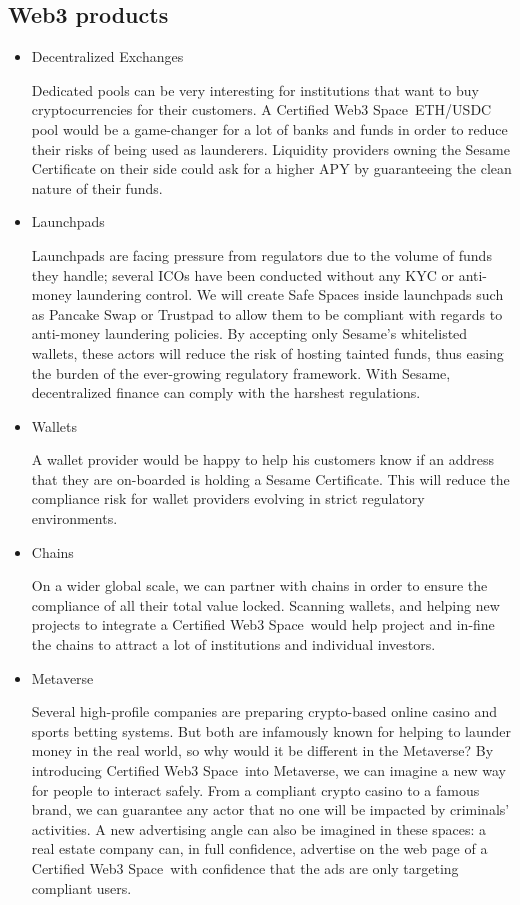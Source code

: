 ﻿\documentclass[a4paper]{article}
\begin{document}
\subsection{Web3 products}
\begin{itemize} 
\item Decentralized Exchanges

Dedicated pools can be very interesting for institutions that want to buy cryptocurrencies for their customers. A Certified Web3 Space\texttrademark\ ETH/USDC pool would be a game-changer for a lot of banks and funds in order to reduce their risks of being used as launderers. Liquidity providers owning the Sesame Certificate on their side could ask for a higher APY by guaranteeing the clean nature of their funds. 

\item Launchpads

Launchpads are facing pressure from regulators due to the volume of funds they handle; several ICOs have been conducted without any KYC or anti-money laundering control. We will create Safe Spaces inside launchpads such as Pancake Swap or Trustpad to allow them to be compliant with regards to anti-money laundering policies. By accepting only Sesame’s whitelisted wallets, these actors will reduce the risk of hosting tainted funds, thus easing the burden of the ever-growing regulatory framework. With Sesame, decentralized finance can comply with the harshest regulations.


\item Wallets

A wallet provider would be happy to help his customers know if an address that they are on-boarded is holding a Sesame Certificate. This will reduce the compliance risk for wallet providers evolving in strict regulatory environments. 

\item Chains

On a wider global scale, we can partner with chains in order to ensure the compliance of all their total value locked. Scanning wallets, and helping new projects to integrate a Certified Web3 Space\texttrademark\ would help project and in-fine the chains to attract a lot of institutions and individual investors.

\item Metaverse

Several high-profile companies are preparing crypto-based online casino and sports betting systems. But both are infamously known for helping to launder money in the real world, so why would it be different in the Metaverse? By introducing Certified Web3 Space\texttrademark\ into Metaverse, we can imagine a new way for people to interact safely. From a compliant crypto casino to a famous brand, we can guarantee any actor that no one will be impacted by criminals' activities. A new advertising angle can also be imagined in these spaces: a real estate company can, in full confidence, advertise on the web page of a Certified Web3 Space\texttrademark\ with confidence that the ads are only targeting compliant users.


\end{itemize}
\end{document}
